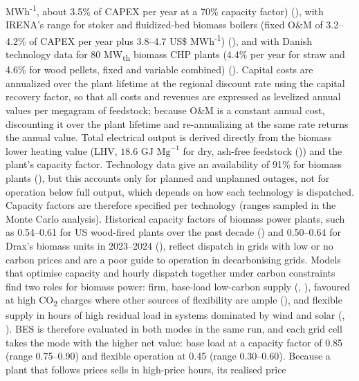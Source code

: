 \documentclass[
  letterpaper,
]{article}
\begin{document}
MWh\textsuperscript{-1}, about 3.5\% of CAPEX per year at a 70\%
capacity factor) (), with IRENA's range
for stoker and fluidized-bed biomass boilers (fixed O\&M of 3.2--4.2\%
of CAPEX per year plus 3.8--4.7 US\$ MWh\textsuperscript{-1})
(), and with Danish technology data
for 80 MW\textsubscript{th} biomass CHP plants (4.4\% per year for straw
and 4.6\% for wood pellets, fixed and variable combined)
(). Capital costs are annualized over
the plant lifetime at the regional discount rate using the capital
recovery factor, so that all costs and revenues are expressed as
levelized annual values per megagram of feedstock; because O\&M is a
constant annual cost, discounting it over the plant lifetime and
re-annualizing at the same rate returns the annual value. Total
electrical output is derived directly from the biomass lower heating
value (LHV, \(18.6\text{ GJ Mg}^{-1}\) for dry, ash-free feedstock
()) and the plant's capacity factor.
Technology data give an availability of 91\% for biomass plants
(), but this accounts only for planned
and unplanned outages, not for operation below full output, which
depends on how each technology is dispatched. Capacity factors are
therefore specified per technology (ranges sampled in the Monte Carlo
analysis). Historical capacity factors of biomass power plants, such as
0.54--0.61 for US wood-fired plants over the past decade
() and 0.50--0.64 for Drax's biomass
units in 2023--2024 (), reflect
dispatch in grids with low or no carbon prices and are a poor guide to
operation in decarbonising grids. Models that optimise capacity and
hourly dispatch together under carbon constraints find two roles for
biomass power: firm, base-load low-carbon supply
(,
), favoured at high
CO\textsubscript{2} charges where other sources of flexibility are ample
(), and flexible supply in hours of
high residual load in systems dominated by wind and solar
(,
). BES is therefore evaluated in
both modes in the same run, and each grid cell takes the mode with the
higher net value: base load at a capacity factor of 0.85 (range
0.75--0.90) and flexible operation at 0.45 (range 0.30--0.60). Because a
plant that follows prices sells in high-price hours, its realised price
\end{document}
